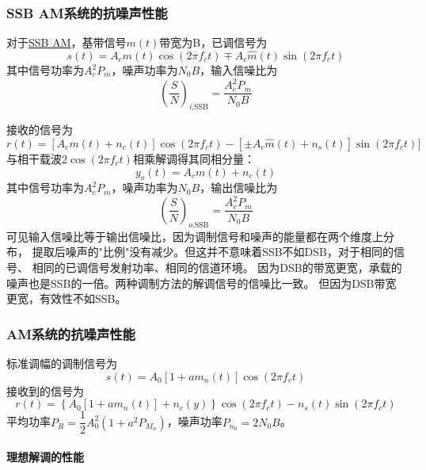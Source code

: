    \subsubsection{SSB AM系统的抗噪声性能}

    对于\hyperref[subsubsec:SSB]{SSB AM}，基带信号$m(t)$带宽为B，已调信号为
    \begin{equation}
        s(t)=A_cm(t)\cos(2\pi f_ct)\mp A_c\hat{m}(t)\sin(2\pi f_ct)
    \end{equation}
    其中信号功率为$A_c^2P_m$，噪声功率为$N_0B$，输入信噪比为
    \begin{equation}
        \left(\frac{S}{N}\right)_{i\text{,SSB}}=\frac{A_c^2P_m}{N_0B}
    \end{equation}

    接收的信号为
    \begin{equation}
        r(t)=[A_cm(t)+n_c(t)]\cos(2\pi f_ct)-[\pm A_c\hat{m}(t)+n_s(t)]\sin(2\pi f_ct)]
    \end{equation}
    与相干载波$2\cos(2\pi f_ct)$相乘解调得其同相分量：
    \begin{equation}
        y_o(t)=A_cm(t)+n_c(t)
    \end{equation}
    其中信号功率为$A_c^2P_m$，噪声功率为$N_0B$，输出信噪比为
    \begin{equation}
        \left(\frac{S}{N}\right)_{o\text{,SSB}}=\frac{A_c^2P_m}{N_0B}
    \end{equation}
    可见输入信噪比等于输出信噪比，因为调制信号和噪声的能量都在两个维度上分布，
    提取后噪声的"比例"没有减少。但这并不意味着SSB不如DSB，对于相同的信号、
    相同的已调信号发射功率、相同的信道环境。
    因为DSB的带宽更宽，承载的噪声也是SSB的一倍。两种调制方法的解调信号的信噪比一致。
    但因为DSB带宽更宽，有效性不如SSB。

    \subsubsection{AM系统的抗噪声性能}
    标准调幅的调制信号为
    \begin{equation}
        s(t)=A_0[1+am_n(t)]\cos(2\pi f_ct)
    \end{equation}
    接收到的信号为
    \begin{equation}
        r(t)=\left\{A_0[1+am_n(t)]+n_c(y)\right\}\cos(2\pi f_ct)-n_s(t)\sin(2\pi f_ct)
    \end{equation}
    平均功率$P_R=\dfrac{1}{2}A_0^2(1+a^2P_{M_n})$，噪声功率$P_{n_0}=2N_0B$。

    \paragraph{理想解调的性能}\mbox{}

